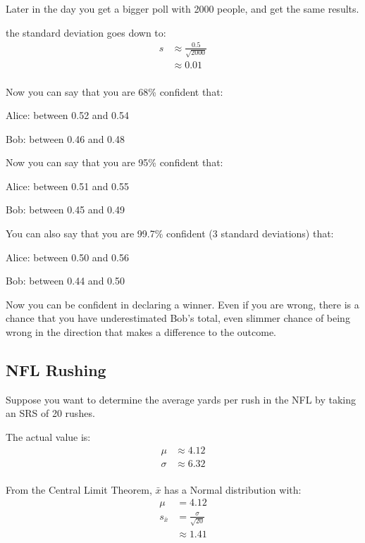 \documentclass[letterpaper, landscape]{exam}
\begin{document}
  Later in the day you get a bigger poll with 2000 people, and get the same
  results.
  
  the standard deviation goes down to:
  \begin{align*}
    s & \approx \frac{0.5}{\sqrt{2000}} \\
      & \approx 0.01 \\
  \end{align*}

  Now you can say that you are 68\% confident that:
  \begin{itemize*}
    \item Alice: between 0.52 and 0.54
    \item Bob: between 0.46 and 0.48
  \end{itemize*}

  Now you can say that you are 95\% confident that:
  \begin{itemize*}
    \item Alice: between 0.51 and 0.55
    \item Bob: between 0.45 and 0.49
  \end{itemize*}

  You can also say that you are 99.7\% confident (3 standard deviations) that:
  \begin{itemize*}
    \item Alice: between 0.50 and 0.56
    \item Bob: between 0.44 and 0.50
  \end{itemize*}

  Now you can be confident in declaring a winner. Even if you are wrong, there
  is a chance that you have underestimated Bob's total, even slimmer chance of
  being wrong in the direction that makes a difference to the outcome.

  \subsection{NFL Rushing}

  Suppose you want to determine the average yards per rush in the NFL by taking
  an SRS of 20 rushes.

  The actual value is:
  \begin{align*}
    \mu    & \approx 4.12 \\
    \sigma & \approx 6.32 \\
  \end{align*}

  From the Central Limit Theorem, $\bar{x}$ has a Normal distribution with:
  \begin{align*}
    \mu         & = 4.12 \\
    s_{\bar{x}} & = \frac{\sigma}{\sqrt{20}} \\
                & \approx 1.41 \\
  \end{align*}
\end{document}
